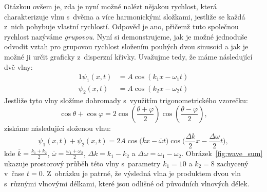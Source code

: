 Otázkou ovšem je, zda je nyní možné nalézt nějakou
 rychlost, která charakterizuje
vlnu s~dvěma a více harmonickými složkami, jestliže
se každá z~nich pohybuje vlastní rychlostí.
Odpověď je ano, přičemž tuto společnou rychlost
nazýváme \textit{grupovou}. Nyní si demonstrujeme,
jak je možné jednoduše odvodit vztah pro
grupovou rychlost složením pouhých dvou
sinusoid a jak je možné ji určit graficky
z~disperzní křivky. Uvažujme tedy, že máme
následující dvě vlny:
\begin{alignat*}{1}
\psi_1(x, t) &= A\cos(k_1x - \omega_1t)\\
\psi_2(x, t) &= A\cos(k_2x - \omega_2t)
\end{alignat*}
Jestliže tyto vlny složíme dohromady
s~využitím trigonometrického vzorečku:
$$
\cos \theta +\cos \varphi =2\cos \left({\frac {\theta +\varphi }{2}}\right)\cos \left({\frac {\theta -\varphi }{2}}\right),
$$
získáme následující složenou vlnu:
$$
\psi_1(x, t) + \psi_2(x, t) =
2A\cos\Big(\overline{k}x - \overline{\omega}t\Big)
\cos\Big(\frac{\Delta k}{2}x - 
\frac{\Delta\omega}{2}t\Big),
$$
kde $\overline{k} = \frac{k_1 + k_2}{2}$,
$\overline{\omega} = \frac{\omega_1 + \omega_2}{2}$,
$\Delta k = k_1 - k_2$ a 
$\Delta\omega = \omega_1 - \omega_2$.
Obrázek~\ref{fig:wave_sum} ukazuje prostorový
průběh této vlny s~parametry $k_1 = 10$ a
$k_2 = 8$ zachycený v~čase $t = 0$.
Z~obrázku je patrné, že výsledná vlna je
produktem dvou vln s~různými vlnovými
délkami, které jsou odlišné od původních
vlnových délek.
